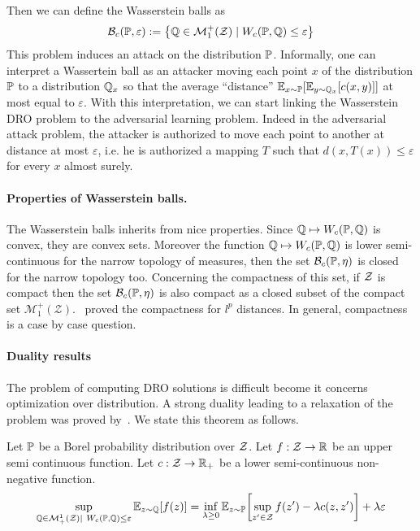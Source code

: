 Then we can define the Wasserstein balls as 
\begin{align*}
    \mathcal{B}_{c}(\PP,\varepsilon) := \left\{\QQ\in \mathcal{M}^+_1(\mathcal{Z})\mid W_c(\PP,\QQ)\leq \varepsilon\right\}
\end{align*}
This problem induces an attack on the distribution $\mathbb{P}$. Informally, one can interpret a Wassertein ball as an attacker moving each point $x$ of the distribution $\mathbb{P}$ to a distribution $\mathbb{Q}_x$ so that the average ``distance'' $\mathbb{E}_{x\sim\PP}\left[\mathbb{E}_{y\sim\QQ_x}\left[c(x,y)\right]\right]$ at most equal to $\varepsilon$. With this interpretation, we can start linking the Wasserstein DRO problem to the adversarial learning problem. Indeed in the adversarial attack problem, the attacker is authorized to move each point to another at distance at most $\varepsilon$, i.e. he is authorized a mapping $T$ such that $d(x,T(x))\leq \varepsilon$ for every $x$ almost surely. 
\paragraph{Properties of Wasserstein balls.} The Wasserstein balls inherits from nice properties. Since $\mathbb{Q}\mapsto  W_c(\mathbb{P},\mathbb{Q})$ is convex, they are convex sets. Moreover the function $\mathbb{Q}\mapsto  W_c(\mathbb{P},\mathbb{Q})$ is lower semi-continuous for the narrow topology of measures, then the set $\mathcal{B}_{c}(\mathbb{P},\eta) $ is closed for the narrow topology too. Concerning the compactness of this set, if $\mathcal{Z}$ is compact then the set $\mathcal{B}_{c}(\mathbb{P},\eta) $ is also compact as a closed subset of the compact set $\mathcal{M}^+_1(\mathcal{Z})$.~\cite{yue2020linear} proved the compactness for $l^p$ distances. In general, compactness is a case by case question. 


\paragraph{Duality results} The problem of computing DRO solutions is difficult become it concerns optimization over distribution. A strong duality leading to a relaxation of the problem was proved by~\cite{blanchet2019quantifying}. We state this theorem as follows.


\begin{thm}
    Let $\mathbb{P}$ be a Borel probability distribution over $\mathcal{Z}$. Let $f:\mathcal{Z}\to\mathbb{R}$ be an upper semi continuous function. Let $c:\mathcal{Z}\to\mathbb{R}_+$ be a lower semi-continuous non-negative function. 
    \begin{align*}
        \sup_{\QQ\in\mathcal{M}^1_+(\ZZ)\mid~W_c(\PP,\QQ)\leq \varepsilon}\mathbb{E}_{z\sim\QQ}\left[f(z)\right] = \inf_{\lambda\geq 0}\mathbb{E}_{z\sim\PP}\left[\sup_{z'\in\ZZ}f(z')-\lambda c(z,z')\right] +\lambda\varepsilon
    \end{align*}
  
\end{thm}

